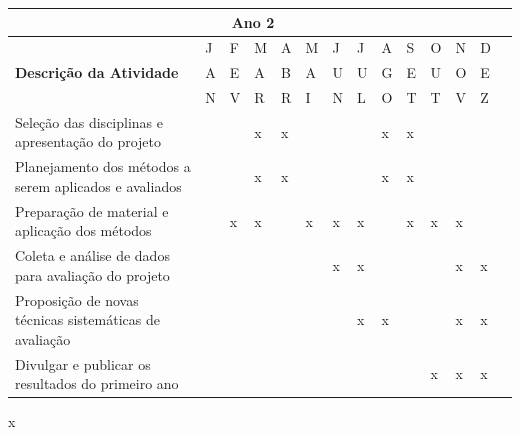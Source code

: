 \documentclass[
  11pt,				
  openright,	
  twoside,	
  a4paper,
  brazil,	
  oldfontcommands,
  ]{abntex2}
\begin{document}
\begin{table}[H]
\begin{center}
\begin{tabularx}{\textwidth}{|p{10cm}|X|X|X|X|X|X|X|X|X|X|X|X|X|}
\multicolumn{13}{|c|}{\cellcolor{lightgray} \textbf{Ano 2}} \\\hline
\cellcolor{lightgray} & J & F & M & A & M & J & J & A & S & O & N & D \\
\cellcolor{lightgray}  \textbf{Descri\c{c}\~{a}o da Atividade} & A & E & A & B & A & U & U & G & E & U & O & E \\
\cellcolor{lightgray}  & N & V & R & R & I & N & L & O & T & T & V & Z \\\hline
Seleção das disciplinas  e apresentação do projeto   	&    &   & x & x &   &   &   &  x &  x  &   &    &   \\\hline
Planejamento dos métodos a 
serem aplicados e avaliados 	&    &   &  x & x &   &   &   & x  &  x  &   &    &   \\\hline
Preparação de material e aplicação dos métodos 		&    & x  & x  &  & x  & x  & x  &   &  x  &  x & x   &   \\\hline
Coleta e análise de dados para 
avaliação do projeto 			&    &   &    &   &   & x  & x  &   &    &   & x   & x  \\\hline
Proposição de novas técnicas 
sistemáticas de avaliação        &    &   &    &   &   &   & x  & x  &    &   &  x  & x  \\\hline
Divulgar e publicar os 
resultados do primeiro ano  	&    &   &   &   &   &   &  &  &  & x & x & x \\\hline
\end{tabularx}
\end{center}
\end{table}
\vspace{-10mm}



{\color{white}x}

\label{DocLastPage}
\end{document}
